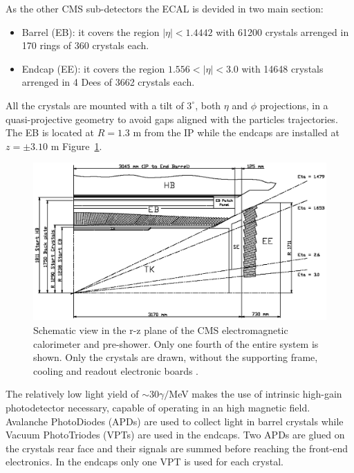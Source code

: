 As the other CMS sub-detectors the ECAL is devided in two main section:
\begin{itemize}%
\item Barrel (EB): it covers the region $|\eta| < 1.4442$ with 61200 crystals arrenged in 170 rings of 360 crystals each.
\item Endcap (EE): it covers the region $1.556 < |\eta| < 3.0$ with 14648 crystals arrenged in 4 Dees of 3662 crystals each.
\end{itemize}

All the crystals are mounted with a tilt of $3^{\circ}$, both $\eta$ and $\phi$ projections, in
a quasi-projective geometry to avoid gaps aligned with the particles trajectories. The EB
is located at $R = 1.3$ m from the IP while the endcaps are installed at $z = \pm 3.10$ m Figure~\ref{fig:cms_ecal_layout}.

\begin{figure}
  \centering
  \includegraphics[width = 1.\textwidth]{figures/cms/ecal_layout.eps}
  \caption{Schematic view in the r-z plane of the CMS electromagnetic calorimeter and pre-shower. Only one fourth of the
    entire system is shown. Only the \PbWO crystals are drawn, without the supporting frame, cooling and readout
    electronic boards \cite{cms_ecal}.}
  \label{fig:cms_ecal_layout}
\end{figure}    

The relatively low light yield of $\sim 30 \gamma/$MeV makes the use of intrinsic high-gain
photodetector necessary, capable of operating in an high magnetic field. Avalanche PhotoDiodes (APDs) are
used to collect light in barrel crystals while Vacuum PhotoTriodes (VPTs) are used in the endcaps.
Two APDs are glued on the crystals rear face and their signals are summed before reaching the front-end electronics.
In the endcaps only one VPT is used for each crystal.

